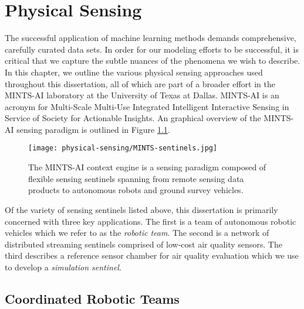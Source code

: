 \chapter{Physical Sensing}

The successful application of machine learning methods demands comprehensive, carefully curated data sets. In order for our modeling efforts to be successful, it is critical that we capture the subtle nuances of the phenomena we wish to describe. In this chapter, we outline the various physical sensing approaches used throughout this dissertation, all of which are part of a broader effort in the MINTS-AI laboratory at the University of Texas at Dallas. MINTS-AI is an acronym for Multi-Scale Multi-Use Integrated Intelligent Interactive Sensing in Service of Society for Actionable Insights. An graphical overview of the MINTS-AI sensing paradigm is outlined in Figure \ref{fig:mints-ai}.

\begin{figure}[!hbt]
  \centering
  \texttt{[image: physical-sensing/MINTS-sentinels.jpg]}
  \caption{The MINTS-AI context engine is a sensing paradigm composed of flexible sensing sentinels spanning from remote sensing data products to autonomous robots and ground survey vehicles.}
  \label{fig:mints-ai}
\end{figure}

Of the variety of sensing sentinels listed above, this dissertation is primarily concerned with three key applications. The first is a team of autonomous robotic vehicles which we refer to as the \textit{robotic team}. The second is a network of distributed streaming sentinels comprised of low-cost air quality sensors. The third describes a reference sensor chamber for air quality evaluation which we use to develop a \textit{simulation sentinel}.



\section{Coordinated Robotic Teams}

